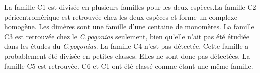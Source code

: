 \documentclass[12pt,a4paper]{article}
\begin{document}
La famille C1 est divisée en plusieurs familles pour les deux espèces.La famille C2 péricentromérique est retrouvée chez les deux espèces et forme un complexe homogène. Les dimères sont une famille d'une centaine de monomères. La famille C3 est retrouvée chez le \textit{C.pogonias} seulement, bien qu'elle n'ait pas été étudiée dans les études du \textit{C.pogonias}. La famille C4 n'est pas détectée. Cette famille a probablement été divisée en petites classes. Elles ne sont donc pas détectées. La famille C5 est retrouvée. C6 et C1 ont été classé comme étant une même famille. 

\end{document}
